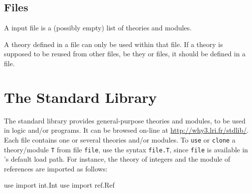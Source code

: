 \subsection{Files}

A \whyml input file is a (possibly empty) list of theories and modules.
\begin{center}\framebox{}\end{center}
A theory defined in a \whyml file can only be used within that
file. If a theory is supposed to be reused from other files, be they
\why or \whyml files, it should be defined in a \why file.


\section{The \why Standard Library}
\label{sec:library}

The \why standard library provides general-purpose theories and
modules, to be used in logic and/or programs.
It can be browsed on-line at \url{http://why3.lri.fr/stdlib/}.
Each file contains one or several theories and/or modules.
To \texttt{use} or \texttt{clone} a theory/module \texttt{T} from file
\texttt{file}, use the syntax \texttt{file.T}, since \texttt{file} is
available in \why's default load path. For instance, the theory of
integers and the module of references are imported as follows:

\begin{whycode}
  use import int.Int
  use import ref.Ref
\end{whycode}


